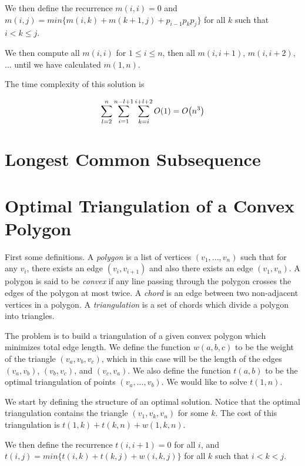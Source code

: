 We then define the recurrence $m(i,i) = 0$ and $m(i,j) = min \{ m(i,k) +
m(k+1,j) + p_{i-1}p_kp_j \}$ for all $k$ such that $i < k \leq j$.

We then compute all $m(i,i)$ for $1 \leq i \leq n$, then all
$m(i,i+1)$, $m(i,i+2)$, ... until we have calculated $m(1,n)$.

The time complexity of this solution is

\[
  \displaystyle\sum\limits_{l=2}^{n}\displaystyle\sum\limits_{i=1}^{n-l+1}\displaystyle\sum\limits_{k=i}^{i+l+2}O\!\left(1\right) = O\!\left(n^3\right)
\]

\section{Longest Common Subsequence}


\section{Optimal Triangulation of a Convex Polygon}


First some definitions.  A \emph{polygon} is a list of vertices
$(v_1,...,v_n)$ such that for any $v_i$, there exists an edge
$(v_i,v_{i+1})$ and also there exists an edge $(v_1,v_n)$.  A polygon
is said to be \emph{convex} if any line passing through the polygon
crosses the edges of the polygon at most twice.  A \emph{chord} is an
edge between two non-adjacent vertices in a polygon.  A
\emph{triangulation} is a set of chords which divide a polygon into
triangles.

The problem is to build a triangulation of a given convex polygon
which minimizes total edge length.  We define the function $w(a,b,c)$
to be the weight of the triangle $(v_a,v_b,v_c)$, which in this case
will be the length of the edges $(v_a,v_b)$, $(v_b,v_c)$, and
$(v_c,v_a)$.  We also define the function $t(a,b)$ to be the optimal
triangulation of points $(v_a,...,v_b)$.  We would like to solve
$t(1,n)$.

We start by defining the structure of an optimal solution.  Notice
that the optimal triangulation contains the triangle $(v_1,v_k,v_n)$
for some $k$.  The cost of this triangulation is $t(1,k) + t(k,n) +
w(1,k,n)$.

We then define the recurrence $t(i,i+1) = 0$ for all $i$, and $t(i,j)
= min \{ t(i,k) + t(k,j) + w(i,k,j) \}$ for all $k$ such that $i < k < j$.

